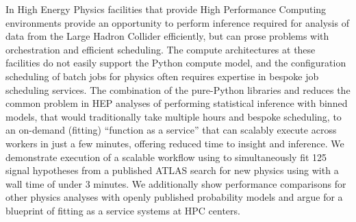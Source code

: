 In High Energy Physics facilities that provide High Performance Computing environments provide an opportunity to perform inference required for analysis of data from the Large Hadron Collider efficiently, but can prose problems with orchestration and efficient scheduling.
The compute architectures at these facilities do not easily support the Python compute model, and the configuration scheduling of batch jobs for physics often requires expertise in bespoke job scheduling services.
The combination of the pure-Python libraries \pyhf{} and \funcX{} reduces the common problem in HEP analyses of performing statistical inference with binned models, that would traditionally take multiple hours and bespoke scheduling, to an on-demand (fitting) ``function as a service'' that can scalably execute across workers in just a few minutes, offering reduced time to insight and inference.
We demonstrate execution of a scalable workflow using \funcX{} to simultaneously fit 125 signal hypotheses from a published ATLAS search for new physics using \pyhf{} with a wall time of under 3 minutes.
We additionally show performance comparisons for other physics analyses with openly published probability models and argue for a blueprint of fitting as a service systems at HPC centers.
